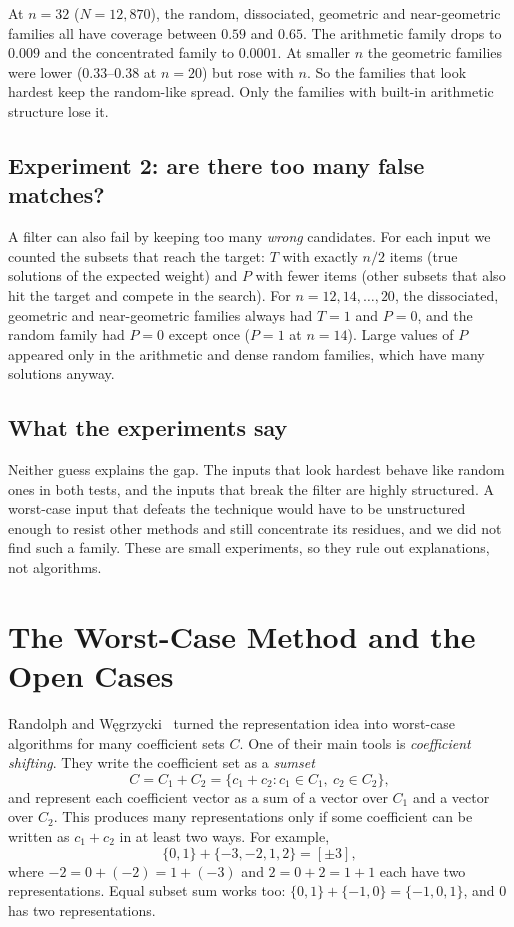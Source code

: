 \documentclass[conference]{IEEEtran}
\begin{document}
At $n=32$ ($N=12{,}870$), the random, dissociated, geometric and near-geometric
families all have coverage between $0.59$ and $0.65$. The arithmetic family
drops to $0.009$ and the concentrated family to $0.0001$. At smaller $n$ the
geometric families were lower ($0.33$--$0.38$ at $n=20$) but rose with $n$. So
the families that look hardest keep the random-like spread. Only the families
with built-in arithmetic structure lose it.

\subsection{Experiment 2: are there too many false matches?}
A filter can also fail by keeping too many \emph{wrong} candidates. For each
input we counted the subsets that reach the target: $T$ with exactly $n/2$
items (true solutions of the expected weight) and $P$ with fewer items (other
subsets that also hit the target and compete in the search). For
$n=12,14,\dots,20$, the dissociated, geometric and near-geometric families
always had $T=1$ and $P=0$, and the random family had $P=0$ except once
($P=1$ at $n=14$). Large values of $P$ appeared only in the arithmetic and
dense random families, which have many solutions anyway.

\subsection{What the experiments say}
Neither guess explains the gap. The inputs that look hardest behave like random
ones in both tests, and the inputs that break the filter are highly structured.
A worst-case input that defeats the technique would have to be unstructured
enough to resist other methods and still concentrate its residues, and we did
not find such a family. These are small experiments, so they rule out
explanations, not algorithms.

\section{The Worst-Case Method and the Open Cases}\label{sec:frontier}
Randolph and W\k{e}grzycki~\cite{rw} turned the representation idea into
worst-case algorithms for many coefficient sets $C$. One of their main tools is
\emph{coefficient shifting}. They write the coefficient set as a \emph{sumset}
\[
C=C_1+C_2=\{c_1+c_2: c_1\in C_1,\ c_2\in C_2\},
\]
and represent each coefficient vector as a sum of a vector over $C_1$ and a
vector over $C_2$. This produces many representations only if some coefficient
can be written as $c_1+c_2$ in at least two ways. For example,
\[
\{0,1\}+\{-3,-2,1,2\}=[\pm3],
\]
where $-2=0+(-2)=1+(-3)$ and $2=0+2=1+1$ each have two representations.
Equal subset sum works too: $\{0,1\}+\{-1,0\}=\{-1,0,1\}$, and $0$ has two
representations.
\end{document}
